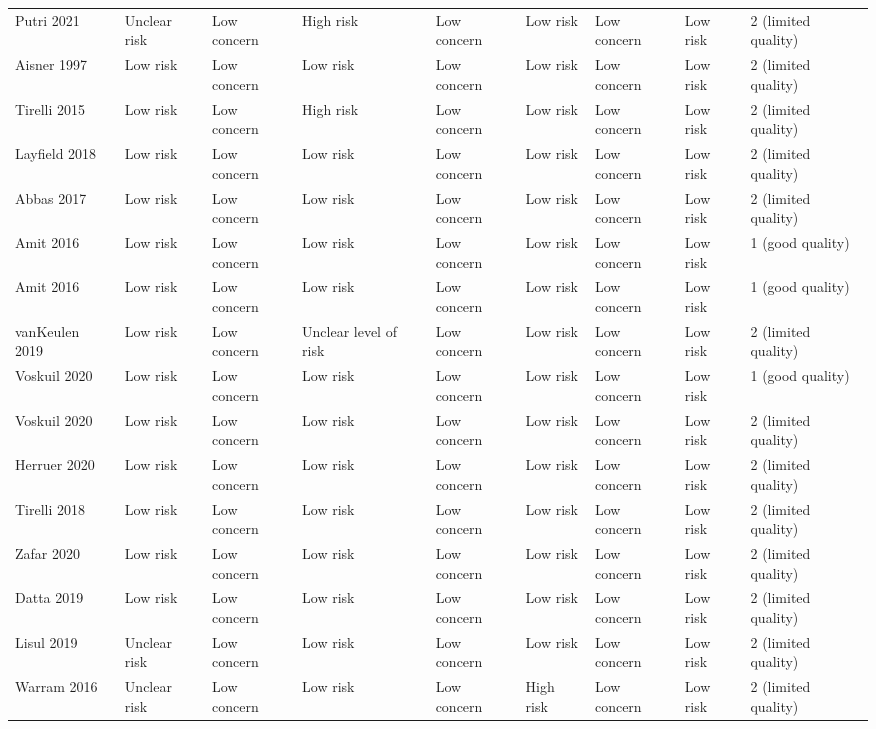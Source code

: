 \begin{table}[ht]
\begin{tabular}{lllllllll}
  Putri 2021 & Unclear risk & Low concern & High risk & Low concern & Low risk & Low concern & Low risk & 2 (limited quality) \\ 
  Aisner 1997 & Low risk & Low concern & Low risk & Low concern & Low risk & Low concern & Low risk & 2 (limited quality) \\ 
  Tirelli 2015 & Low risk & Low concern & High risk & Low concern & Low risk & Low concern & Low risk & 2 (limited quality) \\ 
  Layfield 2018 & Low risk & Low concern & Low risk & Low concern & Low risk & Low concern & Low risk & 2 (limited quality) \\ 
  Abbas 2017 & Low risk & Low concern & Low risk & Low concern & Low risk & Low concern & Low risk & 2 (limited quality) \\ 
  Amit 2016 & Low risk & Low concern & Low risk & Low concern & Low risk & Low concern & Low risk & 1 (good quality) \\ 
  Amit 2016 & Low risk & Low concern & Low risk & Low concern & Low risk & Low concern & Low risk & 1 (good quality) \\ 
  vanKeulen 2019 & Low risk & Low concern & Unclear level of risk & Low concern & Low risk & Low concern & Low risk & 2 (limited quality) \\ 
  Voskuil 2020 & Low risk & Low concern & Low risk & Low concern & Low risk & Low concern & Low risk & 1 (good quality) \\ 
  Voskuil 2020 & Low risk & Low concern & Low risk & Low concern & Low risk & Low concern & Low risk & 2 (limited quality) \\ 
  Herruer 2020 & Low risk & Low concern & Low risk & Low concern & Low risk & Low concern & Low risk & 2 (limited quality) \\ 
  Tirelli 2018 & Low risk & Low concern & Low risk & Low concern & Low risk & Low concern & Low risk & 2 (limited quality) \\ 
  Zafar 2020 & Low risk & Low concern & Low risk & Low concern & Low risk & Low concern & Low risk & 2 (limited quality) \\ 
  Datta 2019 & Low risk & Low concern & Low risk & Low concern & Low risk & Low concern & Low risk & 2 (limited quality) \\ 
  Lisul 2019 & Unclear risk & Low concern & Low risk & Low concern & Low risk & Low concern & Low risk & 2 (limited quality) \\ 
  Warram 2016 & Unclear risk & Low concern & Low risk & Low concern & High risk & Low concern & Low risk & 2 (limited quality) \\ 

\end{tabular}
\end{table}
